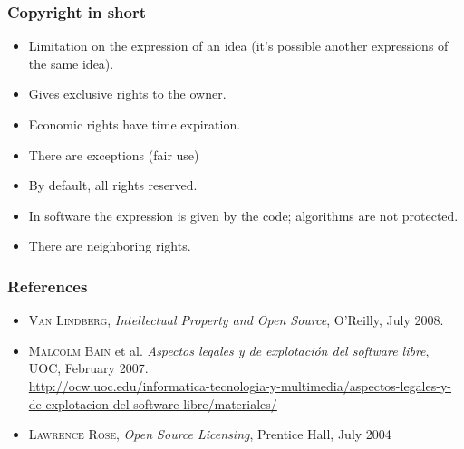 \begin{frame}
\frametitle{Copyright in short}

\begin{itemize}
\item Limitation on the \alert{expression} of an idea (it's possible another expressions of the same idea).
\item Gives exclusive rights to the owner.
\item Economic rights have time expiration.
\item There are exceptions (fair use)
\item By default, all rights reserved.
\item In software the expression is given by the code; algorithms are
not protected.
\item There are neighboring rights.

\end{itemize}

\end{frame}




\begin{frame}
\frametitle{References}

\begin{itemize}
\item \textsc{Van Lindberg}, \textit{Intellectual Property and Open Source}, O'Reilly, July 2008.
\item \textsc{Malcolm Bain} et al. \textit{Aspectos legales y de explotación del software libre}, UOC, February 2007. \\
{\footnotesize \url{http://ocw.uoc.edu/informatica-tecnologia-y-multimedia/aspectos-legales-y-de-explotacion-del-software-libre/materiales/}}
\item \textsc{Lawrence Rose}, \textit{Open Source Licensing}, Prentice Hall, July 2004 

\end{itemize}

\end{frame}





